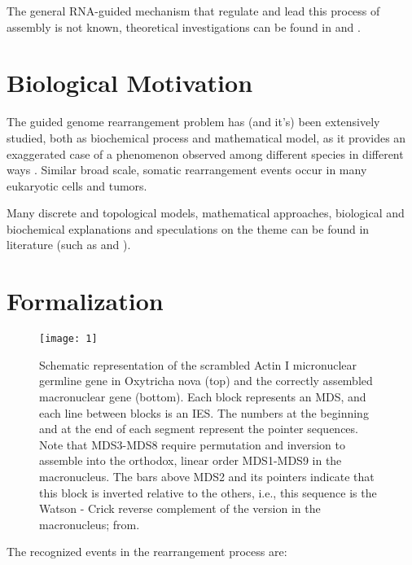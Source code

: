 The general RNA-guided mechanism that regulate and lead this process of assembly is not known, theoretical investigations can be found in \cite{Brijder2007} and \cite{Ehrenfeucht:2004:CLC:971120}.

\section{Biological Motivation}
The guided genome rearrangement problem has (and it's) been extensively \cite{Ehrenfeucht:2004:CLC:971120} studied, both as biochemical process and mathematical model, as it provides an exaggerated case of a phenomenon observed among different species in different ways \cite{ANGELESKA20093020}. Similar broad scale, somatic rearrangement events occur in many eukaryotic cells and tumors.

Many discrete and topological models, mathematical approaches, biological and biochemical explanations and speculations on the theme can be found in literature (such as \cite{prescott2001} \cite{Brijder2014} \cite{ANGELESKA2007706} and \cite{programmedgenome}).
\clearpage
\section{Formalization}

\begin{figure}[h]
  \centering
    \texttt{[image: 1]}
  \caption{Schematic representation of the scrambled Actin I micronuclear germline gene in Oxytricha nova (top) and the correctly assembled macronuclear gene (bottom). Each block represents an MDS, and each line between blocks is an IES. The numbers at the beginning and at the end of each segment represent the pointer sequences. Note that MDS3-MDS8 require permutation and inversion to assemble into the orthodox, linear order MDS1-MDS9 in the macronucleus. The bars above MDS2 and its pointers indicate that this block is inverted relative to the others, i.e., this sequence is the Watson - Crick reverse complement of the version in the macronucleus; from\cite{prescottgreslin}.}

\end{figure}

The recognized events in the rearrangement process are:

